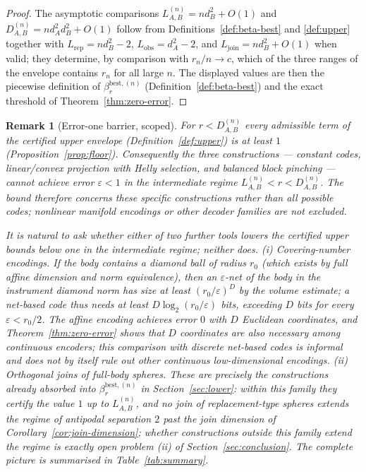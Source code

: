 \documentclass[11pt,a4paper]{article}
\newtheorem{remark}[theorem]{Remark}
\begin{document}
\begin{proof}
The asymptotic comparisons $L_{A,B}^{(n)}=nd_B^2+O(1)$ and $D_{A,B}^{(n)}=nd_A^2d_B^2+O(1)$ follow from Definitions~\ref{def:beta-best} and \ref{def:upper} together with $L_{\mathrm{rep}}=nd_B^2-2$, $L_{\mathrm{obs}}=d_A^2-2$, and $L_{\mathrm{join}}=nd_B^2+O(1)$ when valid; they determine, by comparison with $r_n/n\to c$, which of the three ranges of the envelope contains $r_n$ for all large $n$. The displayed values are then the piecewise definition of $\beta_r^{\mathrm{best},(n)}$ (Definition~\ref{def:beta-best}) and the exact threshold of Theorem~\ref{thm:zero-error}.
\end{proof}

\begin{remark}[Error-one barrier, scoped]
\label{rem:barrier}
For $r<D_{A,B}^{(n)}$ every admissible term of the certified upper envelope (Definition~\ref{def:upper}) is at least $1$ (Proposition~\ref{prop:floor}). Consequently the three constructions --- constant codes, linear/convex projection with Helly selection, and balanced block pinching --- cannot achieve error $\varepsilon<1$ in the intermediate regime $L_{A,B}^{(n)}<r<D_{A,B}^{(n)}$. The bound therefore concerns these specific constructions rather than all possible codes; nonlinear manifold encodings or other decoder families are not excluded.

It is natural to ask whether either of two further tools lowers the certified upper bounds below one in the intermediate regime; neither does. (i) \emph{Covering-number encodings.} If the body contains a diamond ball of radius $r_0$ (which exists by full affine dimension and norm equivalence), then an $\varepsilon$-net of the body in the instrument diamond norm has size at least $(r_0/\varepsilon)^{D}$ by the volume estimate; a net-based code thus needs at least $D\log_2(r_0/\varepsilon)$ bits, exceeding $D$ bits for every $\varepsilon<r_0/2$. The affine encoding achieves error $0$ with $D$ Euclidean coordinates, and Theorem~\ref{thm:zero-error} shows that $D$ coordinates are also necessary among continuous encoders; this comparison with discrete net-based codes is informal and does not by itself rule out other continuous low-dimensional encodings. (ii) \emph{Orthogonal joins of full-body spheres.} These are precisely the constructions already absorbed into $\beta_r^{\mathrm{best},(n)}$ in Section~\ref{sec:lower}: within this family they certify the value $1$ up to $L_{A,B}^{(n)}$, and no join of replacement-type spheres extends the regime of antipodal separation $2$ past the join dimension of Corollary~\ref{cor:join-dimension}; whether constructions outside this family extend the regime is exactly open problem (ii) of Section~\ref{sec:conclusion}. The complete picture is summarised in Table~\ref{tab:summary}.
\end{remark}
\end{document}
